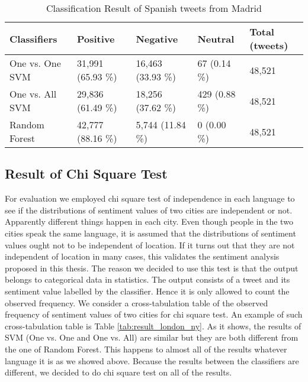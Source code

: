 \begin{table}[ht]
	\caption{Classification Result of Spanish tweets from Madrid}
	\begin{tabular}{|l|p{1.8cm}|p{1.8cm}|p{1.8cm}|p{1.8cm}|} \hline
	Classifiers & Positive & Negative & Neutral & Total (tweets)\\ \hline
One vs. One SVM & 31,991 (65.93 \%) & 16,463 (33.93 \%)& 67 (0.14 \%)& 48,521 \\ \hline
One vs. All SVM & 29,836 (61.49 \%)& 18,256 (37.62 \%)& 429 (0.88 \%)& 48,521 \\ \hline
Random Forest   & 42,777 (88.16 \%)& 5,744 (11.84 \%) & 0 (0.00 \%)  & 48,521 \\ \hline
	\end{tabular}
	\label{tab:result_madrid_es}
\end{table}

\begin{comment}
London
N.Y or San Francisco

\end{comment}

\subsection{Result of Chi Square Test}
For evaluation we employed chi square test of independence in each language to see if the distributions of sentiment values of two cities are independent or not. 
Apparently different things happen in each city.
Even though people in the two cities speak the same language, it is assumed that the distributions of sentiment values ought not to be independent of location.  
If it turns out that they are not independent of location in many cases, this validates the sentiment analysis proposed in this thesis.
The reason we decided to use this test is that the output belongs to categorical data in statistics.
The output consists of a tweet and its sentiment value labelled by the classifier.
Hence it is only allowed to count the observed frequency.
We consider a cross-tabulation table of the observed frequency of sentiment values of two cities for chi square test.
An example of such cross-tabulation table is Table \ref{tab:result_london_ny}.
As it shows, the results of SVM (One vs. One and One vs. All) are similar but they are both different from the one of Random Forest.
This happens to almost all of the results whatever language it is as we showed above.
Because the results between the classifiers are different, we decided to do chi square test on all of the results.

